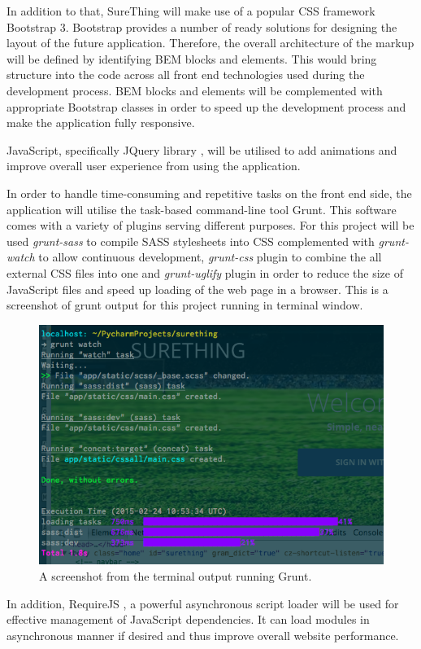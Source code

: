 In addition to that, SureThing will make use of a popular CSS framework Bootstrap 3. Bootstrap provides a number of ready solutions for designing the layout of the future application. Therefore, the overall architecture of the markup will be defined by identifying BEM blocks and elements. This would bring structure into the code across all front end technologies used during the development process. BEM blocks and elements will be complemented with appropriate Bootstrap classes in order to speed up the development process and make the application fully responsive.
 
JavaScript, specifically JQuery library \citet{documentation:jQuery}, will be utilised to add animations and improve overall user experience from using the application.  

In order to handle time-consuming and repetitive tasks on the front end side, the application will utilise the task-based command-line tool Grunt. This software comes with a variety of plugins serving different purposes. For this project will be used \emph{grunt-sass} to compile SASS stylesheets into CSS complemented with \emph{grunt-watch} to allow continuous development, \emph{grunt-css} plugin to combine the all external CSS files into one and \emph{grunt-uglify} plugin in order to reduce the size of JavaScript files and speed up loading of the web page in a browser. This is a screenshot of grunt output for this project running in terminal window.

\begin{figure}[H]
	\begin{center}
		\includegraphics[width=.60\textwidth]{impl/images/gruntInAction}
		\caption{A screenshot from the terminal output running Grunt.} \label{fig:using:gruntinaction}
	\end{center}
\end{figure}
	
In addition, RequireJS  \citet{documentation:RequireJS}, a powerful asynchronous script loader will be used for effective management of JavaScript dependencies. It can load modules in asynchronous manner if desired and thus improve overall website performance.

